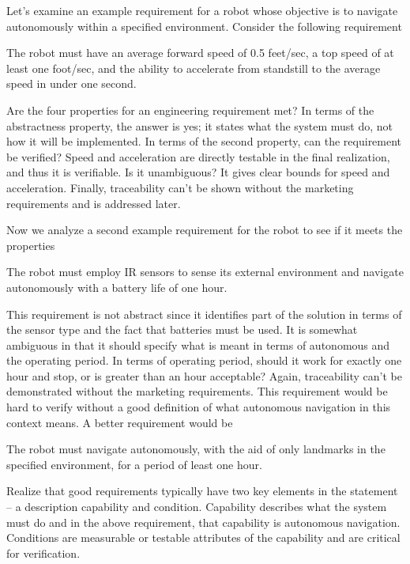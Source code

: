 Let's examine an example requirement for a robot whose objective is to
navigate autonomously within a specified environment. Consider the
following requirement

\begin{itquote}
The robot must have an average forward speed of 0.5 feet/sec, a top
speed of at least one foot/sec, and the ability to accelerate from
standstill to the average speed in under one second.
\end{itquote}

Are the four properties for an engineering requirement met? In terms of
the abstractness property, the answer is yes; it states what the system
must do, not how it will be implemented. In terms of the second
property, can the requirement be verified? Speed and acceleration are
directly testable in the final realization, and thus it is verifiable.
Is it unambiguous? It gives clear bounds for speed and acceleration.
Finally, traceability can't be shown without the marketing requirements
and is addressed later.

Now we analyze a second example requirement for the robot to see if it
meets the properties

\begin{itquote}
The robot must employ IR sensors to sense its external environment and
navigate autonomously with a battery life of one hour.
\end{itquote}

This requirement is not abstract since it identifies part of the
solution in terms of the sensor type and the fact that batteries must be
used. It is somewhat ambiguous in that it should specify what is meant
in terms of autonomous and the operating period. In terms of operating
period, should it work for exactly one hour and stop, or is greater than
an hour acceptable? Again, traceability can't be demonstrated without
the marketing requirements. This requirement would be hard to verify
without a good definition of what autonomous navigation in this context
means. A better requirement would be

\begin{itquote}
The robot must navigate autonomously, with the aid of only landmarks in
the specified environment, for a period of least one hour.
\end{itquote}

Realize that good requirements typically have two key elements in the
statement -- a description capability and condition. Capability
describes what the system must do and in the above requirement, that
capability is autonomous navigation. Conditions are measurable or
testable attributes of the capability and are critical for verification.


